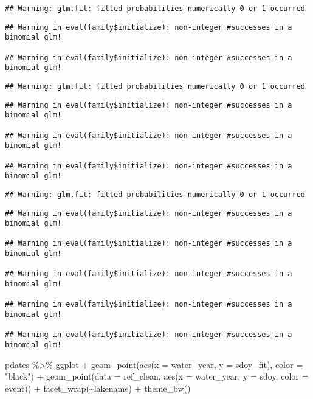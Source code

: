 \documentclass[
]{article}
\newenvironment{Shaded}{\begin{snugshade}}{\end{snugshade}}
\newcommand{\AttributeTok}[1]{\textcolor[rgb]{0.77,0.63,0.00}{#1}}
\newcommand{\FunctionTok}[1]{\textcolor[rgb]{0.00,0.00,0.00}{#1}}
\newcommand{\NormalTok}[1]{#1}
\newcommand{\SpecialCharTok}[1]{\textcolor[rgb]{0.00,0.00,0.00}{#1}}
\newcommand{\StringTok}[1]{\textcolor[rgb]{0.31,0.60,0.02}{#1}}
\begin{document}
\begin{verbatim}
## Warning: glm.fit: fitted probabilities numerically 0 or 1 occurred
\end{verbatim}

\begin{verbatim}
## Warning in eval(family$initialize): non-integer #successes in a binomial glm!

## Warning in eval(family$initialize): non-integer #successes in a binomial glm!
\end{verbatim}

\begin{verbatim}
## Warning: glm.fit: fitted probabilities numerically 0 or 1 occurred
\end{verbatim}

\begin{verbatim}
## Warning in eval(family$initialize): non-integer #successes in a binomial glm!

## Warning in eval(family$initialize): non-integer #successes in a binomial glm!

## Warning in eval(family$initialize): non-integer #successes in a binomial glm!
\end{verbatim}

\begin{verbatim}
## Warning: glm.fit: fitted probabilities numerically 0 or 1 occurred
\end{verbatim}

\begin{verbatim}
## Warning in eval(family$initialize): non-integer #successes in a binomial glm!

## Warning in eval(family$initialize): non-integer #successes in a binomial glm!

## Warning in eval(family$initialize): non-integer #successes in a binomial glm!

## Warning in eval(family$initialize): non-integer #successes in a binomial glm!

## Warning in eval(family$initialize): non-integer #successes in a binomial glm!
\end{verbatim}

\begin{Shaded}
\begin{Highlighting}[]
\NormalTok{pdates }\SpecialCharTok{\%\textgreater{}\%} 
\NormalTok{  ggplot }\SpecialCharTok{+}
  \FunctionTok{geom\_point}\NormalTok{(}\FunctionTok{aes}\NormalTok{(}\AttributeTok{x =}\NormalTok{ water\_year, }\AttributeTok{y =}\NormalTok{ sdoy\_fit), }\AttributeTok{color =} \StringTok{"black"}\NormalTok{) }\SpecialCharTok{+}
  \FunctionTok{geom\_point}\NormalTok{(}\AttributeTok{data =}\NormalTok{ ref\_clean, }\FunctionTok{aes}\NormalTok{(}\AttributeTok{x =}\NormalTok{ water\_year, }\AttributeTok{y =}\NormalTok{ sdoy, }\AttributeTok{color =}\NormalTok{ event)) }\SpecialCharTok{+}
  \FunctionTok{facet\_wrap}\NormalTok{(}\SpecialCharTok{\textasciitilde{}}\NormalTok{lakename) }\SpecialCharTok{+}
  \FunctionTok{theme\_bw}\NormalTok{()}
\end{Highlighting}
\end{Shaded}
\end{document}
